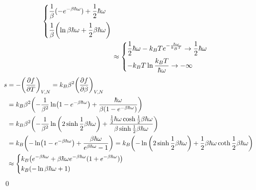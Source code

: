 \documentclass[uplatex,dvipdfmx,a4paper,11pt]{jlreq}
\makeatletter
\theoremstyle{definition}
\renewenvironment{proof}[1][\proofname]{\par
  \normalfont
  \topsep6\p@\@plus6\p@ \trivlist
  \item[\hskip\labelsep{\bfseries #1}\@addpunct{\bfseries}]\ignorespaces\quad\par
}{%
  \qed\endtrivlist\@endpefalse
}
\renewcommand\proofname{証明}
\makeatother
\begin{document}
\begin{proof}
\begin{align}
\begin{dcases}
                  \frac{1}{\beta}(-e^{-\beta\hbar\omega}) + \frac{1}{2}\hbar\omega        \\
                  \frac{1}{\beta}\qty(\ln \beta\hbar\omega + \frac{1}{2}\beta\hbar\omega) \\
                \end{dcases}                                                                                   \\
      & \approx \begin{dcases}
                  \frac{1}{2}\hbar\omega - k_BTe^{-\frac{\hbar\omega}{k_BT}} \to \frac{1}{2}\hbar\omega \\
                  -k_BT\ln\frac{k_BT}{\hbar\omega} \to - \infty                                         \\
                \end{dcases}
  \end{align}
  \begin{align}
    s & = - \qty(\pdv{f}{T})_{V,N} = k_B\beta^2\qty(\pdv{f}{\beta})_{V,N}                                                                                                                                                   \\
      & = k_B\beta^2\qty(-\frac{1}{\beta^2}\ln(1 - e^{-\beta\hbar\omega}) + \frac{\hbar\omega}{\beta(1 - e^{-\beta\hbar\omega})})                                                                                           \\
      & = k_B\beta^2\qty(-\frac{1}{\beta^2}\ln\qty(2\sinh \frac{1}{2}\beta\hbar\omega) + \frac{\frac{1}{2}\hbar\omega\cosh \frac{1}{2}\beta\hbar\omega}{\beta\sinh \frac{1}{2}\beta\hbar\omega})                            \\
      & = k_B\qty(-\ln(1 - e^{-\beta\hbar\omega}) + \frac{\beta\hbar\omega}{e^{\beta\hbar\omega} - 1}) = k_B\qty(-\ln\qty(2\sinh\frac{1}{2}\beta\hbar\omega) + \frac{1}{2}\beta\hbar\omega\coth\frac{1}{2}\beta\hbar\omega) \\
      & \approx \begin{dcases}
                  k_B\qty(e^{-\beta\hbar\omega} + \beta\hbar\omega e^{-\beta\hbar\omega}(1 + e^{-\beta\hbar\omega})) \\
                  k_B\qty(-\ln\beta\hbar\omega + 1)                                                                  \\
                \end{dcases}                                                                                                          \\

\end{align}
\end{proof}
\end{document}
